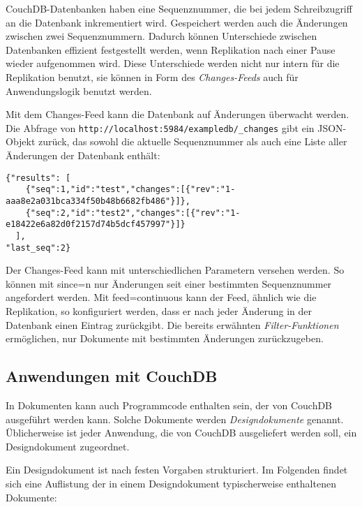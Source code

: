 CouchDB-Datenbanken haben eine Sequenznummer, die bei jedem Schreibzugriff an die Datenbank inkrementiert wird. Gespeichert werden auch die Änderungen  zwischen zwei Sequenznummern. Dadurch können Unterschiede zwischen Datenbanken effizient festgestellt werden, wenn Replikation nach einer Pause wieder aufgenommen wird. Diese Unterschiede werden nicht nur intern für die Replikation benutzt, sie können in Form des \textit{Changes-Feeds} auch für Anwendungslogik benutzt werden. 

\lstset{language=bash}
Mit dem Changes-Feed kann die Datenbank auf Änderungen überwacht werden. Die Abfrage von \lstinline!http://localhost:5984/exampledb/_changes! gibt ein JSON-Objekt zurück, das sowohl die aktuelle Sequenznummer als auch eine Liste aller Änderungen der Datenbank enthält: 

\lstset{language=javascript}

\medskip
\begin{lstlisting}
{"results": [
    {"seq":1,"id":"test","changes":[{"rev":"1-aaa8e2a031bca334f50b48b6682fb486"}]},
    {"seq":2,"id":"test2","changes":[{"rev":"1-e18422e6a82d0f2157d74b5dcf457997"}]}
  ],
"last_seq":2}
\end{lstlisting}

Der Changes-Feed kann mit unterschiedlichen Parametern versehen werden. So können mit {\selectfont since=n} nur Änderungen seit einer bestimmten Sequenznummer angefordert werden. Mit {\selectfont feed=continuous} kann der Feed, ähnlich wie die Replikation, so konfiguriert werden, dass er nach jeder Änderung in der Datenbank einen Eintrag zurückgibt. Die bereits erwähnten \textit{Filter-Funktionen} ermöglichen, nur Dokumente mit bestimmten Änderungen zurückzugeben. 








\subsection{Anwendungen mit CouchDB}
\label{subsec:designdokumente}

In Dokumenten kann auch Programmcode enthalten sein, der von CouchDB ausgeführt werden kann. Solche Dokumente werden \textit{Designdokumente} genannt. Üblicherweise ist jeder Anwendung, die von CouchDB ausgeliefert werden soll, ein Designdokument zugeordnet. 

Ein Designdokument ist nach festen Vorgaben strukturiert. Im Folgenden findet sich eine Auflistung der in einem Designdokument typischerweise enthaltenen Dokumente:

